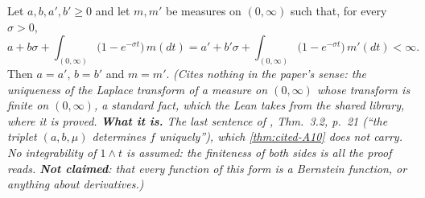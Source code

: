 \begin{lemma}
\label{lem:bernstein-triplet-unique}
\leanok
Let $a, b, a', b' \ge 0$ and let $m, m'$ be measures on $(0,\infty)$ such that, for every
$\sigma > 0$,
\[
  a + b\sigma + \int_{(0,\infty)}\bigl(1 - e^{-\sigma t}\bigr)\,m(dt)
  = a' + b'\sigma + \int_{(0,\infty)}\bigl(1 - e^{-\sigma t}\bigr)\,m'(dt) < \infty .
\]
Then $a = a'$, $b = b'$ and $m = m'$.
\statusT\quad\emph{(Cites nothing in the paper's sense: the uniqueness of the Laplace transform of a
measure on $(0,\infty)$ whose transform is finite on $(0,\infty)$, a standard fact, which the Lean
takes from the shared library, where it is proved. \textbf{What it is.} The last sentence of
, Thm.~3.2, p.~21 (``the triplet $(a, b, \mu)$ determines $f$
uniquely''), which \ref{thm:cited-A10} does not carry. No integrability of $1 \wedge t$ is assumed:
the finiteness of both sides is all the proof reads. \textbf{Not claimed}: that every function of
this form is a Bernstein function, or anything about derivatives.)}
\end{lemma}

